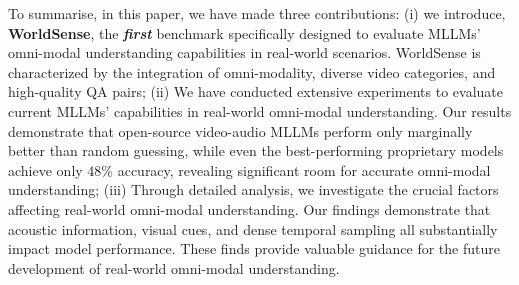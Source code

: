 To summarise, in this paper, we have made three contributions:
(i) we introduce, \textbf{WorldSense}, the \textbf{\textit{first}} benchmark specifically designed to evaluate MLLMs' omni-modal understanding capabilities in real-world scenarios. WorldSense is characterized by the integration of omni-modality, diverse video categories, and high-quality QA pairs;
(ii) We have conducted extensive experiments to evaluate current MLLMs' capabilities in real-world omni-modal understanding. Our results demonstrate that open-source video-audio MLLMs perform only marginally better than random guessing, while even the best-performing proprietary models achieve only $48\%$ accuracy, revealing significant room for accurate omni-modal understanding; 
(iii) Through detailed analysis, we investigate the crucial factors affecting real-world omni-modal understanding. Our findings demonstrate that acoustic information, visual cues, and dense temporal sampling all substantially impact model performance. These finds provide valuable guidance for the future development of real-world omni-modal understanding.

